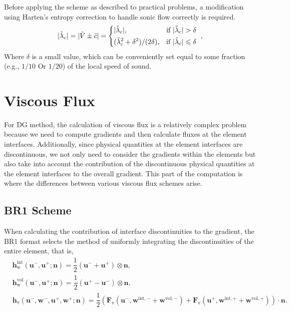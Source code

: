 \documentclass{develop-note}
\begin{document}
Before applying the scheme as described to practical problems, a modification using Harten's entropy correction to handle sonic flow correctly is required.
\begin{equation}
  |\tilde{\lambda}_{c}|=|\tilde{V}\pm\tilde{c}|=\begin{dcases*}
    |\tilde{\lambda}_{c}|, & if $|\tilde{\lambda}_{c}|>\delta$\\
    (\tilde{\lambda}_{c}^{2}+\delta^{2})/(2\delta), & if $|\tilde{\lambda}_{c}|\leqslant\delta$
  \end{dcases*},
\end{equation}
Where $\delta$ is a small value, which can be conveniently set equal to some fraction (e.g., $1/10$ Or $1/20$) of the local speed of sound.

\section{Viscous Flux}

For DG method, the calculation of viscous flux is a relatively complex problem because we need to compute gradients and then calculate fluxes at the element interfaces. Additionally, since physical quantities at the element interfaces are discontinuous, we not only need to consider the gradients within the elements but also take into account the contribution of the discontinuous physical quantities at the element interfaces to the overall gradient. This part of the computation is where the differences between various viscous flux schemes arise.

\subsection*{BR1 Scheme}

When calculating the contribution of interface discontinuities to the gradient, the BR1 format selects the method of uniformly integrating the discontinuities of the entire element, that is,
\begin{equation}
  \begin{aligned}
  &\mathbf{h}^{\mathrm{int}}_{\mathrm{w}}(\mathbf{u}^{-},\mathbf{u}^{+};\mathbf{n})=\dfrac{1}{2}(\mathbf{u}^{-}+\mathbf{u}^{+})\otimes\mathbf{n},\\
  &\mathbf{h}^{\mathrm{vol}}_{\mathrm{w}}(\mathbf{u}^{-},\mathbf{u}^{+};\mathbf{n})=\dfrac{1}{2}(\mathbf{u}^{+}-\mathbf{u}^{-})\otimes\mathbf{n},\\
  &\mathbf{h}_{\mathrm{v}}(\mathbf{u}^{-},\mathbf{w}^{-},\mathbf{u}^{+},\mathbf{w}^{+};\mathbf{n})=\dfrac{1}{2}(\mathbf{F}_{\mathrm{v}}(\mathbf{u}^{-},\mathbf{w}^{\mathrm{int},-}+\mathbf{w}^{\mathrm{vol},-})+\mathbf{F}_{\mathrm{v}}(\mathbf{u}^{+},\mathbf{w}^{\mathrm{int},+}+\mathbf{w}^{\mathrm{vol},+}))\cdot\mathbf{n}.
  \end{aligned}
\end{equation}
\end{document}
